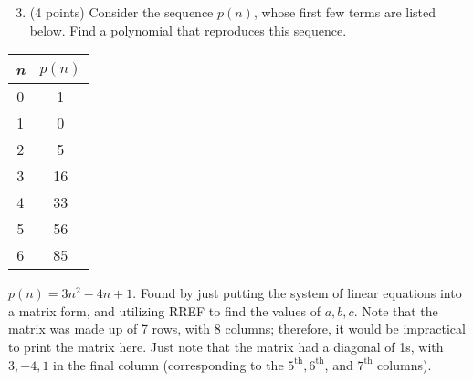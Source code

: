 \documentclass{article}
\begin{document}
\vfill
\begin{enumerate}
    \setcounter{enumi}{2}
    \item (4 points) Consider the sequence $p(n)$, whose first few terms are listed below. Find a polynomial that reproduces this sequence.
\end{enumerate}
\begin{multicols}{2}
    \begin{center}
        
    \begin{tabular}{c|c}
        \textit{n} & \(p(n)\) \\
        \hline
        0 & 1 \\
        1 & 0 \\
        2 & 5 \\
        3 & 16 \\
        4 & 33 \\
        5 & 56 \\
        6 & 85 \\
    \end{tabular}
    \end{center}

\columnbreak

\noindent $p(n) = 3n^2 - 4n + 1$. Found by just putting the system of linear equations into a matrix form, and utilizing RREF to find the values of $a,b,c$. Note that the matrix was made up of 7 rows, with 8 columns; therefore, it would be impractical to print the matrix here. Just note that the matrix had a diagonal of 1s, with $3, -4, 1$ in the final column (corresponding to the $5^{\text{th}}, 6^{\text{th}}$, and $7^{\text{th}}$ columns).

\end{multicols}

\newpage
\end{document}
